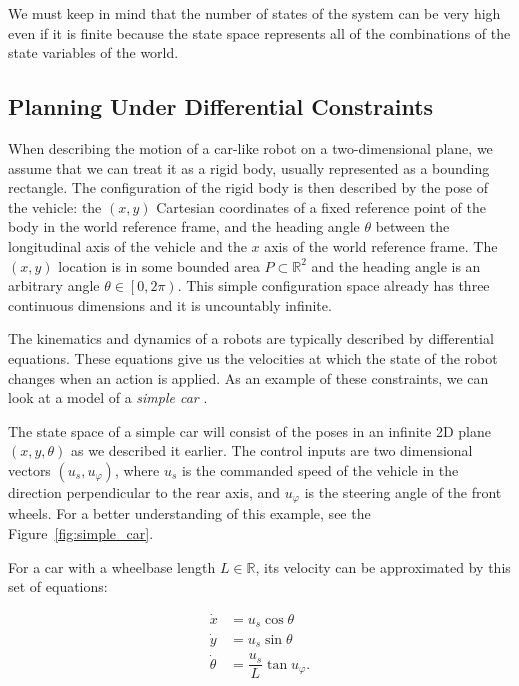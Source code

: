 We must keep in mind that the number of states of the system can be very high even if it is finite because the state space represents all of the combinations of the state variables of the world.

\subsection{Planning Under Differential Constraints}
\label{sec:planning_under_differential_constraints}

When describing the motion of a car-like robot on a two-dimensional plane, we assume that we can treat it as a rigid body, usually represented as a bounding rectangle. The configuration of the rigid body is then described by the pose of the vehicle: the $\left(x,y\right)$ Cartesian coordinates of a fixed reference point of the body in the world reference frame, and the heading angle $\theta$ between the longitudinal axis of the vehicle and the $x$ axis of the world reference frame. The $(x, y)$ location is in some bounded area $P\subset\mathbb{R}^2$ and the heading angle is an arbitrary angle $\theta\in\left[0,2\pi\right)$. This simple configuration space already has three continuous dimensions and it is uncountably infinite.

The kinematics and dynamics of a robots are typically described by differential equations. These equations give us the velocities at which the state of the robot changes when an action is applied. As an example of these constraints, we can look at a model of a \textit{simple car} \cite[Section~13.1.2.1]{lavalle_2006}.

\begin{example}
The state space of a simple car will consist of the poses in an infinite 2D plane $(x, y, \theta)$ as we described it earlier. The control inputs are two dimensional vectors $\left(u_s, u_\varphi\right)$, where $u_s$ is the commanded speed of the vehicle in the direction perpendicular to the rear axis, and $u_\varphi$ is the steering angle of the front wheels. For a better understanding of this example, see the Figure~\ref{fig:simple_car}.

For a car with a wheelbase length $L\in\mathbb{R}$, its velocity can be approximated by this set of equations:

\begin{equation}
\begin{aligned}
	\dot{x}&=u_s \cos \theta \\
	\dot{y}&=u_s \sin \theta \\
	\dot{\theta}&=\dfrac{u_s}{L} \tan u_\varphi.
\end{aligned}
\end{equation}
\end{example}

